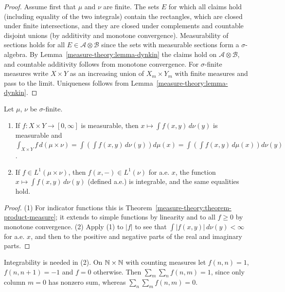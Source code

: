 \begin{proof}
Assume first that $\mu$ and $\nu$ are finite. The sets $E$ for which all claims hold (including equality of the two integrals) contain the rectangles, which are closed under finite intersections, and
they are closed under complements and countable disjoint unions (by additivity and monotone convergence). Measurability of sections holds for all $E \in \mathcal{A} \otimes \mathcal{B}$ since the sets with
measurable sections form a $\sigma$-algebra. By Lemma~\ref{measure-theory:lemma-dynkin} the claims hold on $\mathcal{A} \otimes \mathcal{B}$, and countable additivity follows from monotone convergence.
For $\sigma$-finite measures write $X \times Y$ as an increasing union of $X_m \times Y_m$ with finite measures and pass to the limit. Uniqueness follows from Lemma~\ref{measure-theory:lemma-dynkin}.
\end{proof}

\begin{theorem}\label{measure-theory:theorem-fubini}
Let $\mu$, $\nu$ be $\sigma$-finite.
\begin{enumerate}
\item If $f \colon X \times Y \to [0, \infty]$ is measurable, then $x \mapsto \int f(x, y)\,d\nu(y)$ is measurable and
$\int_{X \times Y}f\,d(\mu \times \nu) = \int\left(\int f(x, y)\,d\nu(y)\right)d\mu(x) = \int\left(\int f(x, y)\,d\mu(x)\right)d\nu(y)$.
\item If $f \in L^1(\mu \times \nu)$, then $f(x, -) \in L^1(\nu)$ for a.e. $x$, the function $x \mapsto \int f(x, y)\,d\nu(y)$ (defined a.e.) is integrable, and the same equalities hold.
\end{enumerate}
\end{theorem}

\begin{proof}
(1) For indicator functions this is Theorem~\ref{measure-theory:theorem-product-measure}; it extends to simple functions by linearity and to all $f \geq 0$ by monotone convergence. (2) Apply (1) to $|f|$ to see that
$\int|f(x, y)|\,d\nu(y) < \infty$ for a.e. $x$, and then to the positive and negative parts of the real and imaginary parts.
\end{proof}

\begin{counterexample}\label{measure-theory:counterexample-fubini}
Integrability is needed in (2). On $\mathbb{N} \times \mathbb{N}$ with counting measures let $f(n, n) = 1$, $f(n, n+1) = -1$ and $f = 0$ otherwise. Then $\sum_m\sum_nf(n, m) = 1$, since only column $m = 0$ has nonzero
sum, whereas $\sum_n\sum_mf(n, m) = 0$.
\end{counterexample}

